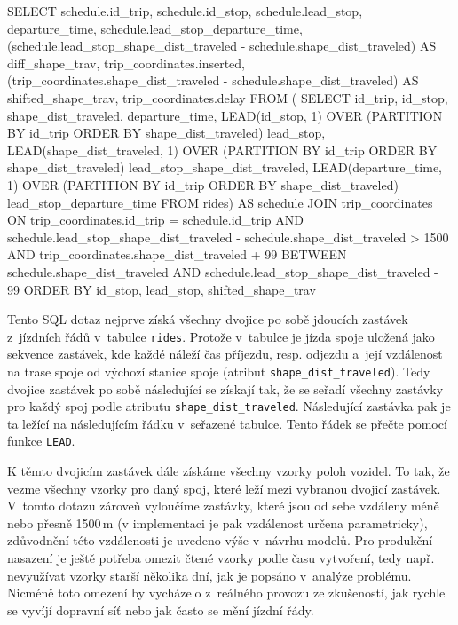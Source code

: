 \begin{code}[frame=none]
SELECT schedule.id_trip,
  schedule.id_stop,
  schedule.lead_stop,
  departure_time,
  schedule.lead_stop_departure_time,
  (schedule.lead_stop_shape_dist_traveled -
    schedule.shape_dist_traveled)
      AS diff_shape_trav,
  trip_coordinates.inserted,
  (trip_coordinates.shape_dist_traveled -
    schedule.shape_dist_traveled)
      AS shifted_shape_trav,
  trip_coordinates.delay
FROM (
  SELECT id_trip, id_stop, shape_dist_traveled, departure_time,
    LEAD(id_stop, 1) OVER (PARTITION BY id_trip
	  ORDER BY shape_dist_traveled) lead_stop,
    LEAD(shape_dist_traveled, 1) OVER (PARTITION BY id_trip
	  ORDER BY shape_dist_traveled) lead_stop_shape_dist_traveled,
    LEAD(departure_time, 1) OVER (PARTITION BY id_trip
	  ORDER BY shape_dist_traveled) lead_stop_departure_time
  FROM rides) AS schedule
JOIN trip_coordinates
ON trip_coordinates.id_trip = schedule.id_trip AND
  schedule.lead_stop_shape_dist_traveled -
    schedule.shape_dist_traveled > 1500 AND
  trip_coordinates.shape_dist_traveled + 99
    BETWEEN schedule.shape_dist_traveled AND
  schedule.lead_stop_shape_dist_traveled - 99
ORDER BY id_stop, lead_stop, shifted_shape_trav
\end{code}


Tento SQL dotaz nejprve získá všechny dvojice po sobě jdoucích zastávek z~jízdních řádů v~tabulce \verb-rides-. Protože v~tabulce je jízda spoje uložená jako sekvence zastávek, kde každé náleží čas příjezdu, resp. odjezdu a~její vzdálenost na trase spoje od výchozí stanice spoje (atribut \verb-shape_dist_traveled-). Tedy dvojice zastávek po sobě následující se získají tak, že se seřadí všechny zastávky pro každý spoj podle atributu \verb-shape_dist_traveled-. Následující zastávka pak je ta ležící na následujícím řádku v~seřazené tabulce. Tento řádek se přečte pomocí funkce \verb-LEAD-.


\bigbreak


K těmto dvojicím zastávek dále získáme všechny vzorky poloh vozidel. To tak, že vezme všechny vzorky pro daný spoj, které leží mezi vybranou dvojicí zastávek. V~tomto dotazu zároveň vyloučíme zastávky, které jsou od sebe vzdáleny méně nebo přesně 1500\,m (v implementaci je pak vzdálenost určena parametricky), zdůvodnění této vzdálenosti je uvedeno výše v~návrhu modelů. Pro produkční nasazení je ještě potřeba omezit čtené vzorky podle času vytvoření, tedy např. nevyužívat vzorky starší několika dní, jak je popsáno v~analýze problému. Nicméně toto omezení by vycházelo z~reálného provozu ze zkušeností, jak rychle se vyvíjí dopravní síť nebo jak často se mění jízdní řády.


